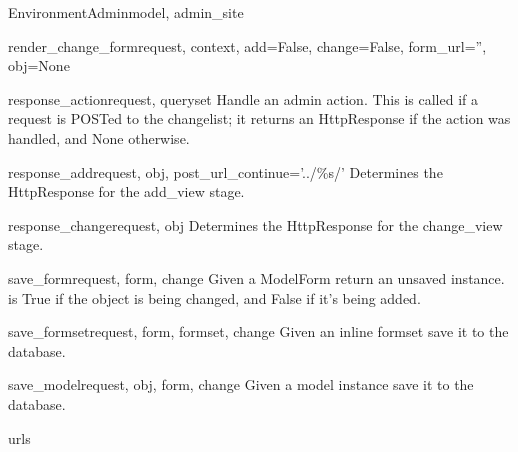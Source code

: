 \documentclass[letterpaper,10pt,english]{sphinxmanual}
\begin{document}
\begin{classdesc}{EnvironmentAdmin}{model, admin\_site}
\hypertarget{data.admin.EnvironmentAdmin.render_change_form}{}\begin{methoddesc}{render\_change\_form}{request, context, add=False, change=False, form\_url='', obj=None}\end{methoddesc}

\hypertarget{data.admin.EnvironmentAdmin.response_action}{}\begin{methoddesc}{response\_action}{request, queryset}
Handle an admin action. This is called if a request is POSTed to the
changelist; it returns an HttpResponse if the action was handled, and
None otherwise.
\end{methoddesc}

\hypertarget{data.admin.EnvironmentAdmin.response_add}{}\begin{methoddesc}{response\_add}{request, obj, post\_url\_continue='../\%s/'}
Determines the HttpResponse for the add\_view stage.
\end{methoddesc}

\hypertarget{data.admin.EnvironmentAdmin.response_change}{}\begin{methoddesc}{response\_change}{request, obj}
Determines the HttpResponse for the change\_view stage.
\end{methoddesc}

\hypertarget{data.admin.EnvironmentAdmin.save_form}{}\begin{methoddesc}{save\_form}{request, form, change}
Given a ModelForm return an unsaved instance.  is True if
the object is being changed, and False if it's being added.
\end{methoddesc}

\hypertarget{data.admin.EnvironmentAdmin.save_formset}{}\begin{methoddesc}{save\_formset}{request, form, formset, change}
Given an inline formset save it to the database.
\end{methoddesc}

\hypertarget{data.admin.EnvironmentAdmin.save_model}{}\begin{methoddesc}{save\_model}{request, obj, form, change}
Given a model instance save it to the database.
\end{methoddesc}

\hypertarget{data.admin.EnvironmentAdmin.urls}{}\begin{memberdesc}{urls}\end{memberdesc}
\end{classdesc}
\end{document}
